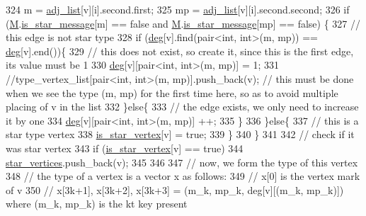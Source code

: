 \begin{DoxyCode}
324       m = \hyperlink{classcolored__graph_a45dce16965079286cf3f41a54a1b2ea4}{adj\_list}[v][i].second.first;
325       mp = \hyperlink{classcolored__graph_a45dce16965079286cf3f41a54a1b2ea4}{adj\_list}[v][i].second.second;
326       \textcolor{keywordflow}{if} (\hyperlink{classcolored__graph_ab72c568fe12f7c849ca6bffb145aec47}{M}.\hyperlink{classgraph__message_a55ff5531a0043106369e84a7bc45e22d}{is\_star\_message}[m] == \textcolor{keyword}{false} and \hyperlink{classcolored__graph_ab72c568fe12f7c849ca6bffb145aec47}{M}.\hyperlink{classgraph__message_a55ff5531a0043106369e84a7bc45e22d}{is\_star\_message}[mp] == \textcolor{keyword}{false})
      \{
327         \textcolor{comment}{// this edge is not star type}
328         \textcolor{keywordflow}{if} (\hyperlink{classcolored__graph_ae3269d35c1b022bc70d195bebd4e1b8a}{deg}[v].find(pair<int, int>(m, mp)) == \hyperlink{classcolored__graph_ae3269d35c1b022bc70d195bebd4e1b8a}{deg}[v].end())\{
329           \textcolor{comment}{// this does not exist, so create it, since this is the first edge, its value must be 1}
330           \hyperlink{classcolored__graph_ae3269d35c1b022bc70d195bebd4e1b8a}{deg}[v][pair<int, int>(m, mp)] = 1;
331           \textcolor{comment}{//type\_vertex\_list[pair<int, int>(m, mp)].push\_back(v); // this must be done when we see the type
       (m, mp) for the first time here, so as to avoid multiple placing of v in the list }
332         \}\textcolor{keywordflow}{else}\{
333           \textcolor{comment}{// the edge exists, we only need to increase it by one}
334           \hyperlink{classcolored__graph_ae3269d35c1b022bc70d195bebd4e1b8a}{deg}[v][pair<int, int>(m, mp)] ++;
335         \}
336       \}\textcolor{keywordflow}{else}\{
337         \textcolor{comment}{// this is a star type vertex}
338         \hyperlink{classcolored__graph_ad41163e970530c7e45878d299f0dc961}{is\_star\_vertex}[v] = \textcolor{keyword}{true};
339       \}
340     \}
341 
342     \textcolor{comment}{// check if it was star vertex}
343     \textcolor{keywordflow}{if} (\hyperlink{classcolored__graph_ad41163e970530c7e45878d299f0dc961}{is\_star\_vertex}[v] == \textcolor{keyword}{true})
344       \hyperlink{classcolored__graph_ab7ee8d717abde7ad7467ef695038f574}{star\_vertices}.push\_back(v);
345 
346 
347     \textcolor{comment}{// now, we form the type of this vertex}
348     \textcolor{comment}{// the type of a vertex is a vector x as follows:}
349     \textcolor{comment}{// x[0] is the vertex mark of v}
350     \textcolor{comment}{// x[3k+1], x[3k+2], x[3k+3] = (m\_k, mp\_k, deg[v][(m\_k, mp\_k)]) where (m\_k, mp\_k) is the kt key present
}
\end{DoxyCode}

